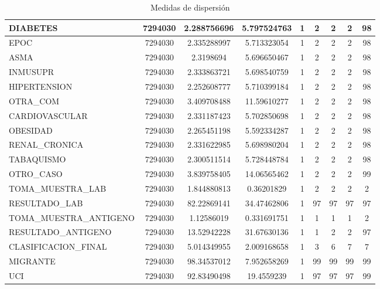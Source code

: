 \begin{table}[h]
{\begin{tabular}{|l|c|c|c|c|c|c|c|c|}
DIABETES                & 7294030 & 2.288756696 & 5.797524763 & 1 & 2  & 2  & 2  & 98  \\ \hline
EPOC                    & 7294030 & 2.335288997 & 5.713323054 & 1 & 2  & 2  & 2  & 98  \\ \hline
ASMA                    & 7294030 & 2.3198694   & 5.696650467 & 1 & 2  & 2  & 2  & 98  \\ \hline
INMUSUPR                & 7294030 & 2.333863721 & 5.698540759 & 1 & 2  & 2  & 2  & 98  \\ \hline
HIPERTENSION            & 7294030 & 2.252608777 & 5.710399184 & 1 & 2  & 2  & 2  & 98  \\ \hline
OTRA\_COM               & 7294030 & 3.409708488 & 11.59610277 & 1 & 2  & 2  & 2  & 98  \\ \hline
CARDIOVASCULAR          & 7294030 & 2.331187423 & 5.702850698 & 1 & 2  & 2  & 2  & 98  \\ \hline
OBESIDAD                & 7294030 & 2.265451198 & 5.592334287 & 1 & 2  & 2  & 2  & 98  \\ \hline
RENAL\_CRONICA          & 7294030 & 2.331622985 & 5.698980204 & 1 & 2  & 2  & 2  & 98  \\ \hline
TABAQUISMO              & 7294030 & 2.300511514 & 5.728448784 & 1 & 2  & 2  & 2  & 98  \\ \hline
OTRO\_CASO              & 7294030 & 3.839758405 & 14.06565462 & 1 & 2  & 2  & 2  & 99  \\ \hline
TOMA\_MUESTRA\_LAB      & 7294030 & 1.844880813 & 0.36201829  & 1 & 2  & 2  & 2  & 2   \\ \hline
RESULTADO\_LAB          & 7294030 & 82.22869141 & 34.47462806 & 1 & 97 & 97 & 97 & 97  \\ \hline
TOMA\_MUESTRA\_ANTIGENO & 7294030 & 1.12586019  & 0.331691751 & 1 & 1  & 1  & 1  & 2   \\ \hline
RESULTADO\_ANTIGENO     & 7294030 & 13.52942228 & 31.67630136 & 1 & 1  & 2  & 2  & 97  \\ \hline
CLASIFICACION\_FINAL    & 7294030 & 5.014349955 & 2.009168658 & 1 & 3  & 6  & 7  & 7   \\ \hline
MIGRANTE                & 7294030 & 98.34537012 & 7.952658269 & 1 & 99 & 99 & 99 & 99  \\ \hline
UCI                     & 7294030 & 92.83490498 & 19.4559239  & 1 & 97 & 97 & 97 & 99  \\ \hline
\end{tabular}
}
\caption{Medidas de dispersión}
\label{tabla:autores}
\end{table}


